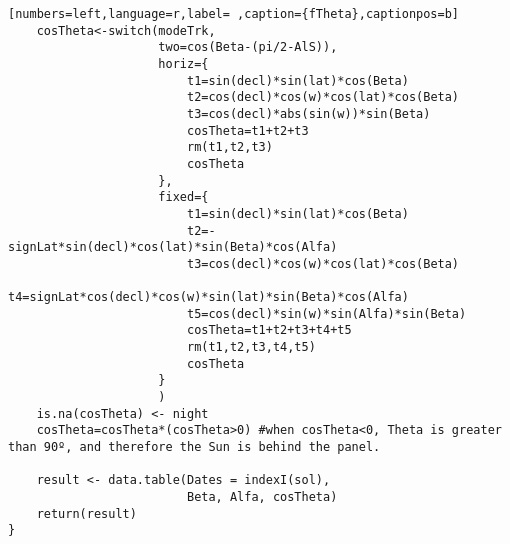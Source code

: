 \begin{lstlisting}[numbers=left,language=r,label= ,caption={fTheta},captionpos=b]
    cosTheta<-switch(modeTrk,
                     two=cos(Beta-(pi/2-AlS)),
                     horiz={
                         t1=sin(decl)*sin(lat)*cos(Beta)      
                         t2=cos(decl)*cos(w)*cos(lat)*cos(Beta)   
                         t3=cos(decl)*abs(sin(w))*sin(Beta)   
                         cosTheta=t1+t2+t3
                         rm(t1,t2,t3)
                         cosTheta
                     },
                     fixed={
                         t1=sin(decl)*sin(lat)*cos(Beta)      
                         t2=-signLat*sin(decl)*cos(lat)*sin(Beta)*cos(Alfa) 
                         t3=cos(decl)*cos(w)*cos(lat)*cos(Beta)   
                         t4=signLat*cos(decl)*cos(w)*sin(lat)*sin(Beta)*cos(Alfa) 
                         t5=cos(decl)*sin(w)*sin(Alfa)*sin(Beta)   
                         cosTheta=t1+t2+t3+t4+t5
                         rm(t1,t2,t3,t4,t5)
                         cosTheta
                     }
                     )
    is.na(cosTheta) <- night
    cosTheta=cosTheta*(cosTheta>0) #when cosTheta<0, Theta is greater than 90º, and therefore the Sun is behind the panel.

    result <- data.table(Dates = indexI(sol),
                         Beta, Alfa, cosTheta)
    return(result)
}
\end{lstlisting}

